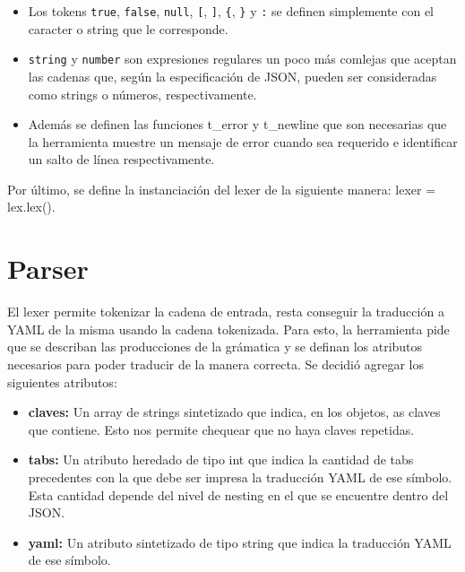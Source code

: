 \documentclass{article}
\begin{document}
\begin{itemize}
    \item Los tokens \texttt{true}, \texttt{false}, \texttt{null}, \texttt{[}, \texttt{]}, \texttt{\{}, \texttt{\}} y \texttt{:} se definen simplemente con el caracter o string que le corresponde.
    \item \texttt{string} y \texttt{number} son expresiones regulares un poco más comlejas que aceptan las cadenas que, según la especificación de JSON, pueden ser consideradas como strings o números, respectivamente.
    \item Además se definen las funciones t\_error y t\_newline que son necesarias que la herramienta muestre un mensaje de error cuando sea requerido e identificar un salto de línea respectivamente.
\end{itemize}

Por último, se define la instanciación del lexer de la siguiente manera: lexer = lex.lex().

\section{Parser}

El lexer permite tokenizar la cadena de entrada, resta conseguir la traducción a YAML de la misma usando la cadena tokenizada. Para esto, la herramienta pide que se describan las producciones de la grámatica y se definan los atributos necesarios para poder traducir de la manera correcta. Se decidió agregar los siguientes atributos:

\begin{itemize}
	\item \textbf{claves:} Un array de strings sintetizado que indica, en los objetos, as claves que contiene. Esto nos permite chequear que no haya claves repetidas.
	\item \textbf{tabs:} Un atributo heredado de tipo int que indica la cantidad de tabs precedentes con la que debe ser impresa la traducción YAML de ese símbolo. Esta cantidad depende del nivel de nesting en el que se encuentre dentro del JSON.
	\item \textbf{yaml:} Un atributo sintetizado de tipo string que indica la traducción YAML de ese símbolo.
\end{itemize}
\end{document}
